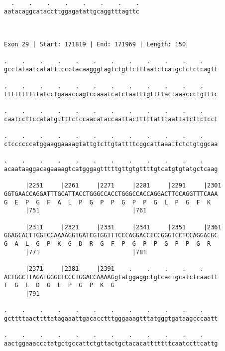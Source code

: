 \documentclass{article}
\begin{document}
\begin{Verbatim}
  .    .    .    .    .    .    .    .
aatacaggcataccttggagatattgcaggtttagttc
                                      
                                      
 
Exon 29 | Start: 171819 | End: 171969 | Length: 150
 
.    .    .    .    .    .    .    .    .    .    .    .    
gcctataatcatatttccctacaagggtagtctgttctttaatctcatgctctctcagtt
                                                            
.    .    .    .    .    .    .    .    .    .    .    .    
ttttttttttatcctgaaaccagtccaaatcatctaatttgttttactaaaccctgtttc
                                                            
.    .    .    .    .    .    .    .    .    .    .    .    
caatccttccatatgttttctccaacataccaattactttttatttaattatcttctcct
                                                            
.    .    .    .    .    .    .    .    .    .    .    .    
ctccccccatggaaggaaaagtattgtcttgtattttcggcattaaattctctgtggcaa
                                                            
.    .    .    .    .    .    .    .    .    .    .    .    
acaataaggacagaaaagtcatgggagtttttgttgtgttttgtcatgtgtatgctcaag
                                                            
      |2251     |2261     |2271     |2281     |2291     |2301
GGTGAACCAGGATTTGCATTACCTGGGCCACCTGGGCCACCAGGACTTCCAGGTTTCAAA
G  E  P  G  F  A  L  P  G  P  P  G  P  P  G  L  P  G  F  K  
      |751                          |761                    
  
      |2311     |2321     |2331     |2341     |2351     |2361
GGAGCACTTGGTCCAAAAGGTGATCGTGGTTTCCCAGGACCTCCGGGTCCTCCAGGACGC
G  A  L  G  P  K  G  D  R  G  F  P  G  P  P  G  P  P  G  R  
      |771                          |781                    
  
      |2371     |2381     |2391    .    .    .    .    .    
ACTGGCTTAGATGGGCTCCCTGGACCAAAAGgtatggaggctgtcactgcatctcaactt
T  G  L  D  G  L  P  G  P  K  G                             
      |791                                                  
  
.    .    .    .    .    .    .    .    .    .    .    .    
gcttttaacttttatagaaattgacacctttgggaaagtttatgggtgataagcccaatt
                                                            
.    .    .    .    .    .    .    .    .    .    .    .    
aactggaaaccctatgctgccattctgttactgctacacatttttttcaatccttcattg
                                                            

\end{Verbatim}
\end{document}
